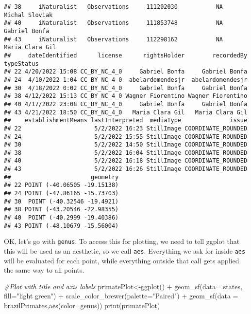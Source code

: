\documentclass[
]{book}
\newenvironment{Shaded}{\begin{snugshade}}{\end{snugshade}}
\newcommand{\AttributeTok}[1]{\textcolor[rgb]{0.77,0.63,0.00}{#1}}
\newcommand{\CommentTok}[1]{\textcolor[rgb]{0.56,0.35,0.01}{\textit{#1}}}
\newcommand{\FunctionTok}[1]{\textcolor[rgb]{0.00,0.00,0.00}{#1}}
\newcommand{\NormalTok}[1]{#1}
\newcommand{\OtherTok}[1]{\textcolor[rgb]{0.56,0.35,0.01}{#1}}
\newcommand{\SpecialCharTok}[1]{\textcolor[rgb]{0.00,0.00,0.00}{#1}}
\newcommand{\StringTok}[1]{\textcolor[rgb]{0.31,0.60,0.02}{#1}}
\begin{document}
\begin{verbatim}
## 38     iNaturalist   Observations     111202030           NA     Michal Sloviak
## 40     iNaturalist   Observations     111853748           NA      Gabriel Bonfa
## 43     iNaturalist   Observations     112298162           NA    Maria Clara Gil
##     dateIdentified      license      rightsHolder        recordedBy typeStatus
## 22 4/20/2022 15:08 CC_BY_NC_4_0     Gabriel Bonfa     Gabriel Bonfa           
## 24  4/10/2022 1:04 CC_BY_NC_4_0  abelardomendesjr  abelardomendesjr           
## 30  4/18/2022 0:02 CC_BY_NC_4_0     Gabriel Bonfa     Gabriel Bonfa           
## 38 4/12/2022 15:13 CC_BY_NC_4_0 Wagner Fiorentino Wagner Fiorentino           
## 40 4/17/2022 23:08 CC_BY_NC_4_0     Gabriel Bonfa     Gabriel Bonfa           
## 43 4/21/2022 18:50 CC_BY_NC_4_0   Maria Clara Gil   Maria Clara Gil           
##    establishmentMeans lastInterpreted  mediaType              issue
## 22                     5/2/2022 16:23 StillImage COORDINATE_ROUNDED
## 24                     5/2/2022 15:55 StillImage COORDINATE_ROUNDED
## 30                     5/2/2022 14:50 StillImage COORDINATE_ROUNDED
## 38                     5/2/2022 16:04 StillImage COORDINATE_ROUNDED
## 40                     5/2/2022 16:18 StillImage COORDINATE_ROUNDED
## 43                     5/2/2022 16:26 StillImage COORDINATE_ROUNDED
##                       geometry
## 22 POINT (-40.06505 -19.15138)
## 24 POINT (-47.86165 -15.73703)
## 30  POINT (-40.32546 -19.4921)
## 38 POINT (-43.20546 -22.98355)
## 40  POINT (-40.2999 -19.40386)
## 43 POINT (-48.10679 -15.56004)
\end{verbatim}

OK, let's go with \texttt{genus}. To access this for plotting, we need to tell ggplot that this will be used as an aesthetic, so we call \texttt{aes}. Everything we ask for inside \texttt{aes} will be evaluated for each point, while everything outside that call gets applied the same way to all points.

\begin{Shaded}
\begin{Highlighting}[]
\CommentTok{\#Plot with title and axis labels}
\NormalTok{primatePlot}\OtherTok{\textless{}{-}}\FunctionTok{ggplot}\NormalTok{() }\SpecialCharTok{+} 
  \FunctionTok{geom\_sf}\NormalTok{(}\AttributeTok{data=}\NormalTok{ states, }\AttributeTok{fill=}\StringTok{"light green"}\NormalTok{) }\SpecialCharTok{+}
  \FunctionTok{scale\_color\_brewer}\NormalTok{(}\AttributeTok{palette=}\StringTok{"Paired"}\NormalTok{) }\SpecialCharTok{+}
  \FunctionTok{geom\_sf}\NormalTok{(}\AttributeTok{data =}\NormalTok{ brazilPrimates,}\FunctionTok{aes}\NormalTok{(}\AttributeTok{color=}\NormalTok{genus))}
\FunctionTok{print}\NormalTok{(primatePlot)}
\end{Highlighting}
\end{Shaded}
\end{document}

